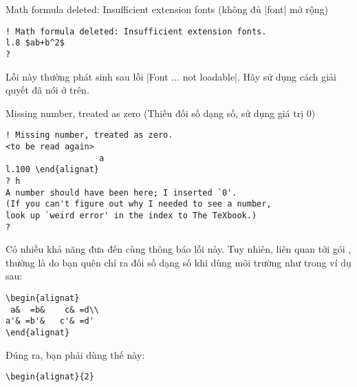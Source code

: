 \begin{error}{Math formula deleted: Insufficient extension fonts}
(không đủ |font| mở rộng)
\errexa
\begin{verbatim}
! Math formula deleted: Insufficient extension fonts.
l.8 $ab+b^2$
?
\end{verbatim}
\errexpl
Lỗi này thường phát sinh sau lỗi |Font ... not loadable|.
Hãy sử dụng cách giải quyết đã nói ở trên.
\end{error}

\begin{error}{Missing number, treated as zero}
(Thiếu đối số dạng số, sử dụng giá trị 0)
\errexa
\begin{verbatim}
! Missing number, treated as zero.
<to be read again>
                   a
l.100 \end{alignat}
? h
A number should have been here; I inserted `0'.
(If you can't figure out why I needed to see a number,
look up `weird error' in the index to The TeXbook.)
?
\end{verbatim}
\errexpl
Có nhiều khả năng đưa đến cùng thông báo lỗi này.
Tuy nhiên, liên quan tới gói , thường là do bạn quên chỉ ra
đối số dạng số khi dùng môi trường  như trong ví dụ sau:
\begin{verbatim}
\begin{alignat}
 a&  =b&    c& =d\\
a'& =b'&   c'& =d'
\end{alignat}
\end{verbatim}
Đúng ra, bạn phải dùng thế này:
\begin{verbatim}
\begin{alignat}{2}
\end{verbatim}


\end{error}
